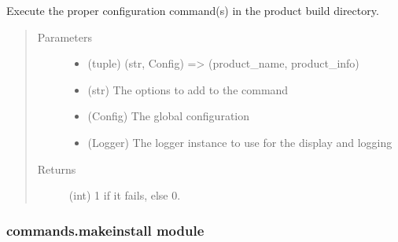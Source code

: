 \documentclass[a4paper,10pt,english]{sphinxmanual}
\begin{document}
\begin{fulllineitems}
\label{\detokenize{apidoc_commands/commands:commands.make.make_product}}
Execute the proper configuration command(s) 
in the product build directory.
\begin{quote}\begin{description}
\item[{Parameters}] \leavevmode\begin{itemize}
\item {} 
 \textendash{} (tuple) (str, Config) =\textgreater{} (product\_name, product\_info)

\item {} 
 \textendash{} (str) The options to add to the command

\item {} 
 \textendash{} (Config) The global configuration

\item {} 
 \textendash{} (Logger) 
The logger instance to use for the display and logging

\end{itemize}

\item[{Returns}] \leavevmode
(int) 1 if it fails, else 0.

\end{description}\end{quote}

\end{fulllineitems}



\subsubsection{commands.makeinstall module}
\label{\detokenize{apidoc_commands/commands:commands-makeinstall-module}}\label{\detokenize{apidoc_commands/commands:module-commands.makeinstall}}
\end{document}
